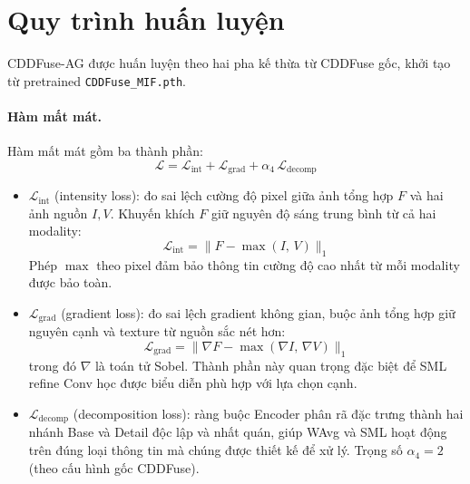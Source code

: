 \section{Quy trình huấn luyện}
\label{sec:training}

CDDFuse-AG được huấn luyện theo hai pha kế thừa từ CDDFuse gốc, khởi tạo từ pretrained \texttt{CDDFuse\_MIF.pth}.

\paragraph{Hàm mất mát.}
Hàm mất mát gồm ba thành phần:
\begin{equation}
\mathcal{L} = \mathcal{L}_{\mathrm{int}} + \mathcal{L}_{\mathrm{grad}} + \alpha_4\,\mathcal{L}_{\mathrm{decomp}}
\end{equation}
\begin{itemize}\itemsep2pt
    \item $\mathcal{L}_{\mathrm{int}}$ (intensity loss): đo sai lệch cường độ pixel giữa ảnh tổng hợp $F$ và hai ảnh nguồn $I, V$. Khuyến khích $F$ giữ nguyên độ sáng trung bình từ cả hai modality:
    \begin{equation}
    \mathcal{L}_{\mathrm{int}} = \bigl\|F - \max(I,\,V)\bigr\|_1
    \end{equation}
    Phép $\max$ theo pixel đảm bảo thông tin cường độ cao nhất từ mỗi modality được bảo toàn.

    \item $\mathcal{L}_{\mathrm{grad}}$ (gradient loss): đo sai lệch gradient không gian, buộc ảnh tổng hợp giữ nguyên cạnh và texture từ nguồn sắc nét hơn:
    \begin{equation}
    \mathcal{L}_{\mathrm{grad}} = \bigl\|\nabla F - \max(\nabla I,\,\nabla V)\bigr\|_1
    \end{equation}
    trong đó $\nabla$ là toán tử Sobel. Thành phần này quan trọng đặc biệt để SML refine Conv học được biểu diễn phù hợp với lựa chọn cạnh.

    \item $\mathcal{L}_{\mathrm{decomp}}$ (decomposition loss): ràng buộc Encoder phân rã đặc trưng thành hai nhánh Base và Detail độc lập và nhất quán, giúp WAvg và SML hoạt động trên đúng loại thông tin mà chúng được thiết kế để xử lý. Trọng số $\alpha_4 = 2$ (theo cấu hình gốc CDDFuse).
\end{itemize}

